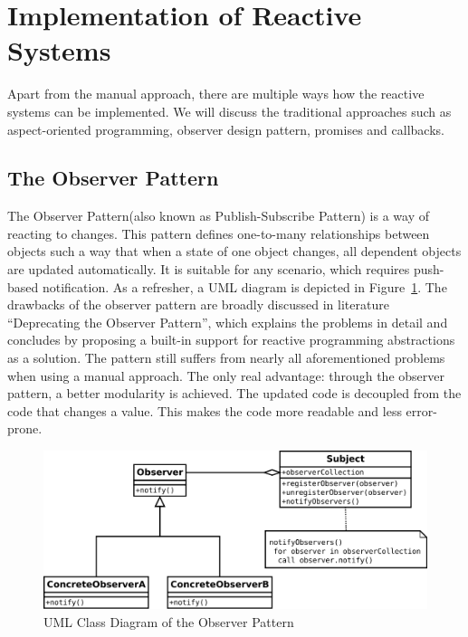 \section {Implementation of Reactive Systems}
Apart from the manual approach, there are multiple ways how the reactive systems can be implemented. We will discuss the traditional approaches such as aspect-oriented programming, observer design pattern, promises and callbacks. 
	
\subsection{The Observer Pattern}
The Observer Pattern(also known as Publish-Subscribe Pattern)\cite{understandingObserverPattern} is a way of reacting to changes. 
This pattern defines one-to-many relationships between objects such a way that when a state of one object changes, all dependent objects are updated automatically. 
It is suitable for any scenario, which requires push-based notification\cite{understandingObserverPattern}. 
As a refresher, a UML diagram is depicted in Figure~\ref{fig:observer-uml}. The drawbacks of the observer pattern are broadly discussed in literature  ``Deprecating the Observer Pattern'', which explains the problems in detail and concludes by proposing a built-in support for reactive programming abstractions as a solution\cite{deprecatingTheObserverPattern}. 
The pattern still suffers from nearly all aforementioned problems when using a manual approach. 
The only real advantage: through the observer pattern, a better modularity is achieved. 
The updated code is decoupled from the code that changes a value. 
This makes the code more readable and less error-prone. 

\begin{figure}[!h]
	\centering
	\includegraphics[scale=0.5,trim=0 0 0 0]{images/observer-uml.png}
	\caption{UML Class Diagram of the Observer Pattern}
	\label{fig:observer-uml}
\end{figure}

